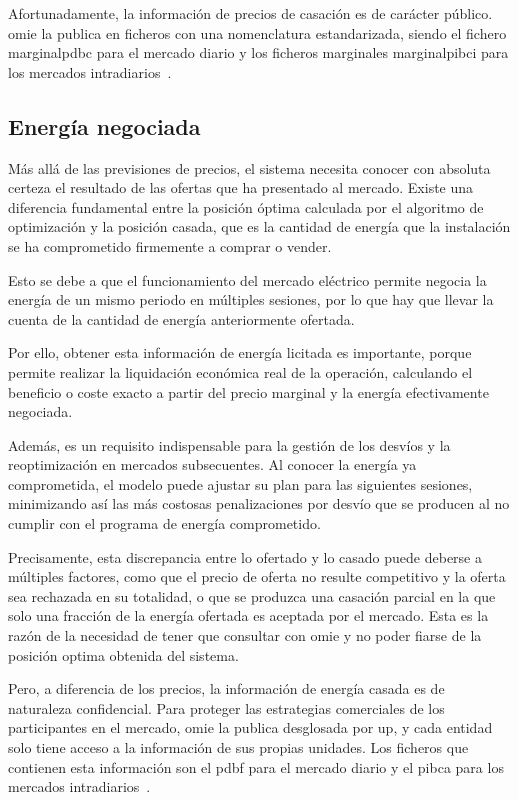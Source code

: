 Afortunadamente, la información de precios de casación es de carácter público. \Gls{omie} la publica en ficheros con una nomenclatura estandarizada, siendo el fichero \gls{marginalpdbc} para el mercado diario y los ficheros marginales \gls{marginalpibci} para los mercados intradiarios~\cite{cnmc2025resolucion}.

\subsection{Energía negociada}%
\label{makereference4.1.2}

Más allá de las previsiones de precios, el sistema necesita conocer con absoluta certeza el resultado de las ofertas que ha presentado al mercado. Existe una diferencia fundamental entre la posición óptima calculada por el algoritmo de optimización y la posición casada, que es la cantidad de energía que la instalación se ha comprometido firmemente a comprar o vender.

Esto se debe a que el funcionamiento del mercado eléctrico permite negocia la energía de un mismo periodo en múltiples sesiones, por lo que hay que llevar la cuenta de la cantidad de energía anteriormente ofertada.

Por ello, obtener esta información de energía licitada es importante, porque permite realizar la liquidación económica real de la operación, calculando el beneficio o coste exacto a partir del precio marginal y la energía efectivamente negociada.

Además, es un requisito indispensable para la gestión de los desvíos y la reoptimización en mercados subsecuentes. Al conocer la energía ya comprometida, el modelo puede ajustar su plan para las siguientes sesiones, minimizando así las más costosas penalizaciones por desvío que se producen al no cumplir con el programa de energía comprometido.

Precisamente, esta discrepancia entre lo ofertado y lo casado puede deberse a múltiples factores, como que el precio de oferta no resulte competitivo y la oferta sea rechazada en su totalidad, o que se produzca una casación parcial en la que solo una fracción de la energía ofertada es aceptada por el mercado. Esta es la razón de la necesidad de tener que consultar con \gls{omie} y no poder fiarse de la posición optima obtenida del sistema.

Pero, a diferencia de los precios, la información de energía casada es de naturaleza confidencial. Para proteger las estrategias comerciales de los participantes en el mercado, \gls{omie} la publica desglosada por \gls{up}, y cada entidad solo tiene acceso a la información de sus propias unidades. Los ficheros que contienen esta información son el \gls{pdbf} para el mercado diario y el \gls{pibca} para los mercados intradiarios~\cite{cnmc2025resolucion}.

